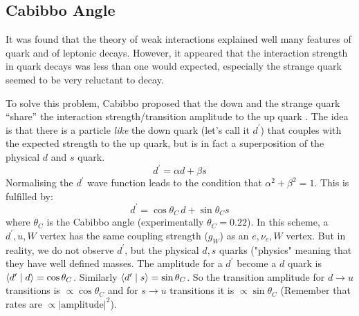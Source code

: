 \subsection{Cabibbo Angle}
 It was found that the 
 theory of weak interactions explained well many features of quark and
 of leptonic decays. However, it appeared that the interaction
 strength in quark decays was less than one would expected, especially
 the strange quark seemed to be very reluctant to decay.

 To solve this problem, Cabibbo proposed that the down and the strange
 quark ``share'' the interaction strength/transition amplitude to the
 up quark \cite{cabibbo}. The idea is that there is a particle
 \emph{like} the down quark (let's call it $d^{\prime}$) that couples
 with the expected strength to the up quark, but is in fact a
 superposition of the physical $d$ and $s$ quark.
 \begin{equation}
     d^{\prime} = \alpha d + \beta s
 \end{equation}
 Normalising the $d^{\prime}$ wave function leads to the condition that $\alpha^2 + \beta^2=1$. This is fulfilled by:
 \begin{equation}
 d^{\prime} = \cos\theta_C \, d + \sin\theta_C s
\end{equation}
where $\theta_C$ is the Cabibbo angle (experimentally $\theta_C = 0.22$).
In this scheme, a $d^{\prime}, u, W$ vertex has the same coupling strength ($g_W$) as an $e, \nu_e, W$ vertex. 
But in reality, we do not observe $d^{\prime}$, but the physical $d, s$ quarks ("physics" meaning that they have well defined masses. 
The amplitude for a $d^{\prime}$ become a $d$ quark is $ \left< d^{\prime}\; |\; d \right> = \cos\theta_C$. Similarly $ \left< d^{\prime}\; |\; s \right> = \sin\theta_C$.
 So the transition amplitude for $d \to u$ transitions is $\propto
 \cos\theta_C$ and for $s\to u$ transitions it is $\propto \sin\theta_C$
 (Remember that rates are $\propto |\mathrm{amplitude}|^2$).
 
